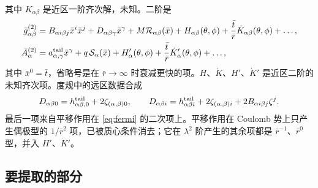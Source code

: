 \documentclass[11pt,a4paper]{ctexart}
\numberwithin{equation}{section}
\begin{document}
其中 $K_{\alpha\beta}$ 是近区一阶齐次解，未知。二阶是
\begin{align}
\bar g^{(2)}_{\alpha\beta}&=B_{\alpha i\beta j}\bar x^i\bar x^j+D_{\alpha\beta\gamma}\bar x^\gamma+M\mathcal R_{\alpha\beta}(\bar x)+H_{\alpha\beta}(\theta,\phi)+\frac{\bar t}{\bar r}\dot K_{\alpha\beta}(\theta,\phi)+\dots,
\label{eq:g2}\\
\bar A^{(2)}_{\alpha}&=a^{\rm tail}_{\alpha,\gamma}\bar x^\gamma+q\,\mathcal S_\alpha(\bar x)+H'_{\alpha}(\theta,\phi)+\frac{\bar t}{\bar r}\dot K'_{\alpha}(\theta,\phi)+\dots,
\label{eq:A2}
\end{align}
其中 $\bar x^0=\bar t$，省略号是在 $\bar r\to\infty$ 时衰减更快的项。$H$、$\dot K$、$H'$、$\dot K'$ 是近区二阶的未知齐次项。度规中的远区数据合成
\begin{equation}
D_{\alpha\beta0}=h^{\rm tail}_{\alpha\beta,0}+2\zeta_{(\alpha,\beta)0},\qquad
D_{\alpha\beta i}=h^{\rm tail}_{\alpha\beta i}+2\zeta_{(\alpha,\beta)i}+2B_{\alpha i\beta j}\zeta^j .
\label{eq:Ddef}
\end{equation}
最后一项来自平移作用在 \eqref{eq:fermi} 的二次项上。平移作用在 Coulomb 势上只产生偶极型的 $1/\bar r^2$ 项，已被质心条件消去；它在 $\lambda^2$ 阶产生的其余项都是 $\bar r^{-1}$、$\bar r^0$ 型，并入 $H'$、$\dot K'$。

\subsection{要提取的部分}
\end{document}
